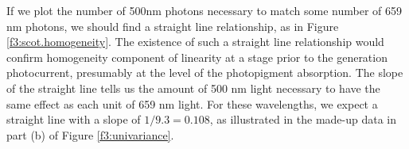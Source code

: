 


If we plot the number of 500nm photons necessary
to match some number of 659 nm photons, we should find
a straight line relationship, as in Figure \ref{f3:scot.homogeneity}.
The existence of such a straight
line relationship would confirm homogeneity component of linearity
at a stage prior to the generation photocurrent,
presumably at the level of the photopigment absorption.
The slope of the straight line tells us the amount of
500 nm light necessary to have the same effect as each unit of
659 nm light.
For these wavelengths, we expect
a straight line with a slope of $1 / 9.3 = 0.108$, as illustrated
in the made-up data in part (b) of Figure \ref{f3:univariance}.
